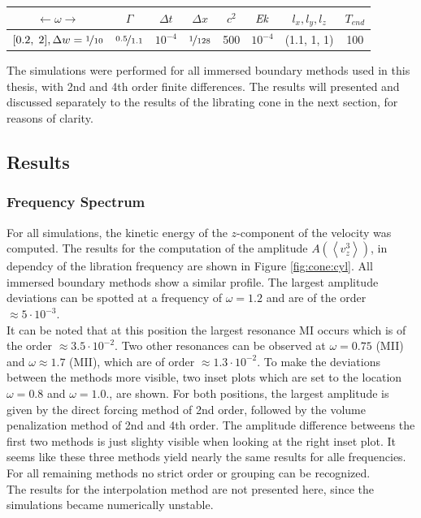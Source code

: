 \begin{center}
\vspace*{0.7ex}
\begin{tabular}{c|c|c|c|c|c|c|c }
 $\leftarrow  \omega \rightarrow $ & $\Gamma$ & $\Delta t$ & $\Delta x$ & $c^2$ & $\mbox{\textit{Ek}}$  & $l_x, l_y, l_z$ & $T_{end}$\\
\hline
 $[0.2,\; 2], \Delta w = \nicefrac{1}{10}$ & $\nicefrac{0.5}{1.1}$ & $10^{-4}$ & $\nicefrac{1}{128}$ & 500 & $10^{-4}$  & (1.1, 1, 1) & 100\\
\end{tabular}
\vspace*{0.7ex}
\end{center}

The simulations were performed for all immersed boundary methods used in this thesis, with 2nd and 4th order finite differences.
The results will presented and discussed separately to the results of the librating cone in the next section, for reasons of clarity.

\clearpage


\subsection{Results}
\subsubsection{Frequency Spectrum}

For all simulations, the kinetic energy of the $z$-component of the velocity was computed.
The results for the computation of the amplitude $A\left(\left<v_z^3\right>\right)$, in dependcy of the libration
frequency are shown in Figure \ref{fig:cone:cyl}.
All immersed boundary methods show a similar profile.
The largest amplitude deviations can be spotted at a frequency of $\omega=1.2$ and are of the order $\approx5\cdot10^{-3}$.\\
It can be noted that at this position the largest resonance M\RN{1} occurs which is of the order $\approx3.5\cdot10^{-2}$.
Two other resonances can be observed at $\omega=0.75$ (M\RN{2}) and $\omega\approx1.7$ (M\RN{2}), which are
of order ${\approx1.3\cdot10^{-2}}$.
To make the deviations between the methods more visible, two inset plots which are
set to the location $\omega=0.8$ and $\omega=1.0$., are shown.
For both positions, the largest amplitude is given by the direct forcing method of 2nd order, followed by
the volume penalization method of 2nd and 4th order.
The amplitude difference betweens the first two methods is just slighty visible when looking at the right inset plot.
It seems like these three methods yield nearly the same results for alle frequencies.
For all remaining methods  no strict order or grouping can be recognized.\\
The results for the interpolation method are not presented here, since the simulations became numerically unstable.

